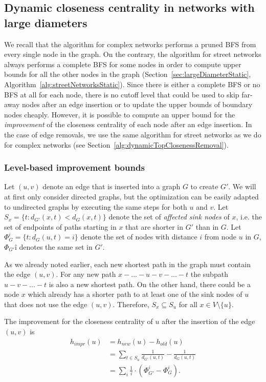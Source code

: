 \subsection{Dynamic closeness centrality in networks with large diameters}
We recall that the algorithm for complex networks performs a pruned BFS from every single node in the graph. On the contrary, the algorithm for street networks always performs a complete BFS for some nodes in order to compute upper bounds for all the other nodes in the graph (Section~\ref{sec:largeDiameterStatic}, Algorithm~\ref{alg:streetNetworksStatic}). Since there is either a complete BFS or no BFS at all for each node, there is no cutoff level that could be used to skip far-away nodes after an edge insertion or to update the upper bounds of boundary nodes cheaply. However, it is possible to compute an upper bound for the \emph{improvement} of the closeness centrality of each node after an edge insertion. In the case of edge removals, we use the same algorithm for street networks as we do for complex networks (see Section~\ref{alg:dynamicTopClosenessRemoval}).

\subsubsection{Level-based improvement bounds}
\label{sec:levelBasedImprovementBounds}
Let $(u, v)$ denote an edge that is inserted into a graph $G$ to create $G'$. We will at first only consider directed graphs, but the optimization can be easily adapted to undirected graphs by executing the same steps for both $u$ and $v$.  Let $S_{x} = \{t : d_{G'}(x, t) < d_G(x, t)\}$ denote the set of \emph{affected sink nodes} of $x$, i.e. the set of endpoints of paths starting in $x$ that are shorter in $G'$ than in $G$. Let $\Phi_{G}^i = \{t : d_G(u, t) = i\}$ denote the set of nodes with distance $i$ from node $u$ in $G$, $\Phi_{G'}î$ denotes the same set in $G'$.

As we already noted earlier, each new shortest path in the graph must contain the edge $(u, v)$. For any new path $x - ... - u - v - ... - t$ the subpath $u - v - ... - t$ is also a new shortest path. On the other hand, there could be a node $x$ which already has a shorter path to at least one of the sink nodes of $u$ that does not use the edge $(u, v)$. Therefore, $S_x \subseteq S_u$ for all $x \in V \setminus \{u\}$.

\begin{definition}
The improvement for the closeness centrality of $u$ after the insertion of the edge $(u, v)$ is 
\begin{align}
	h_{impr}(u) &= h_{new}(u) - h_{old}(u) \nonumber \\
	            &= \sum_{t \in S_u}{\frac{1}{d_{G'}(u, t)} - \frac{1}{d_G(u, t)}} \nonumber \\
	            &= \sum_{i}{\frac{1}{i} \cdot \left(\Phi_{G'}^i - \Phi_G^i\right)} \label{eq:levelImprovementBound}.
\end{align}
\end{definition}

